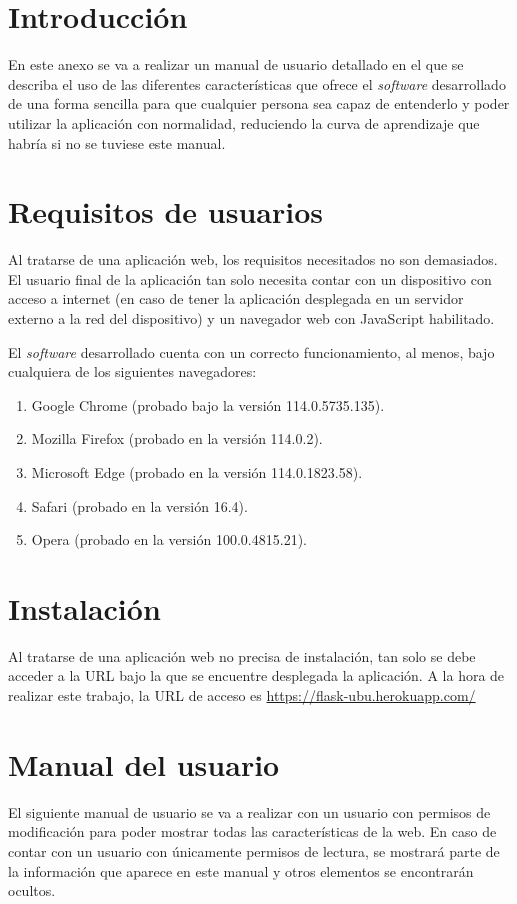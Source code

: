 
\section{Introducción}
En este anexo se va a realizar un manual de usuario detallado en el que se describa el uso de las diferentes características que ofrece el \textit{software} desarrollado de una forma sencilla para que cualquier persona sea capaz de entenderlo y poder utilizar la aplicación con normalidad, reduciendo la curva de aprendizaje que habría si no se tuviese este manual.

\section{Requisitos de usuarios}
Al tratarse de una aplicación web, los requisitos necesitados no son demasiados.
El usuario final de la aplicación tan solo necesita contar con un dispositivo con acceso a internet (en caso de tener la aplicación desplegada en un servidor externo a la red del dispositivo) y un navegador web con JavaScript habilitado.

El \textit{software} desarrollado cuenta con un correcto funcionamiento, al menos, bajo cualquiera de los siguientes navegadores:

\begin{enumerate}
\item Google Chrome (probado bajo la versión 114.0.5735.135).
\item Mozilla Firefox (probado en la versión 114.0.2).
\item Microsoft Edge (probado en la versión 114.0.1823.58).
\item Safari (probado en la versión 16.4).
\item Opera (probado en la versión 100.0.4815.21).
\end{enumerate}

\section{Instalación}
Al tratarse de una aplicación web no precisa de instalación, tan solo se debe acceder a la URL bajo la que se encuentre desplegada la aplicación. 
A la hora de realizar este trabajo, la URL de acceso es \url{https://flask-ubu.herokuapp.com/}

\section{Manual del usuario}
El siguiente manual de usuario se va a realizar con un usuario con permisos de modificación para poder mostrar todas las características de la web.
En caso de contar con un usuario con únicamente permisos de lectura, se mostrará parte de la información que aparece en este manual y otros elementos se encontrarán ocultos.

